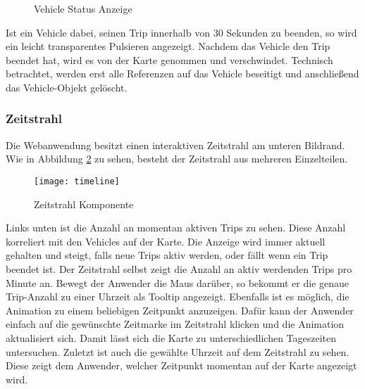     \begin{figure}[htbp]
      \centering
      \hfill
      \caption{Vehicle Status Anzeige}
      \label{fig:vehicle_states}
    \end{figure}

    
    Ist ein Vehicle dabei, seinen Trip innerhalb von 30 Sekunden zu beenden, so wird ein leicht transparentes Pulsieren angezeigt. Nachdem das Vehicle den Trip beendet hat, wird es von der Karte genommen und verschwindet. Technisch betrachtet, werden erst alle Referenzen auf das Vehicle beseitigt und anschließend das Vehicle-Objekt gelöscht.
    

  \subsubsection*{Zeitstrahl}
  \label{ssub:zeitstrahl}
    Die Webanwendung besitzt einen interaktiven Zeitstrahl am unteren Bildrand. Wie in Abbildung \ref{fig:timeline} zu sehen, besteht der Zeitstrahl aus mehreren Einzelteilen. 

    \begin{figure}[htbp]
      \begin{center}
        \texttt{[image: timeline]}
        \caption{Zeitstrahl Komponente}
        \label{fig:timeline}
      \end{center}
    \end{figure}

    Links unten ist die Anzahl an momentan aktiven Trips zu sehen. Diese Anzahl korreliert mit den Vehicles auf der Karte. Die Anzeige wird immer aktuell gehalten und steigt, falls neue Trips aktiv werden, oder fällt wenn ein Trip beendet ist. Der Zeitstrahl selbst zeigt die Anzahl an aktiv werdenden Trips pro Minute an. Bewegt der Anwender die Maus darüber, so bekommt er die genaue Trip-Anzahl zu einer Uhrzeit als Tooltip angezeigt. Ebenfalls ist es möglich, die Animation zu einem beliebigen Zeitpunkt anzuzeigen. Dafür kann der Anwender einfach auf die gewünschte Zeitmarke im Zeitstrahl klicken und die Animation aktualisiert sich. Damit lässt sich die Karte zu unterschiedlichen Tageszeiten untersuchen. Zuletzt ist auch die gewählte Uhrzeit auf dem Zeitstrahl zu sehen. Diese zeigt dem Anwender, welcher Zeitpunkt momentan auf der Karte angezeigt wird.
    
